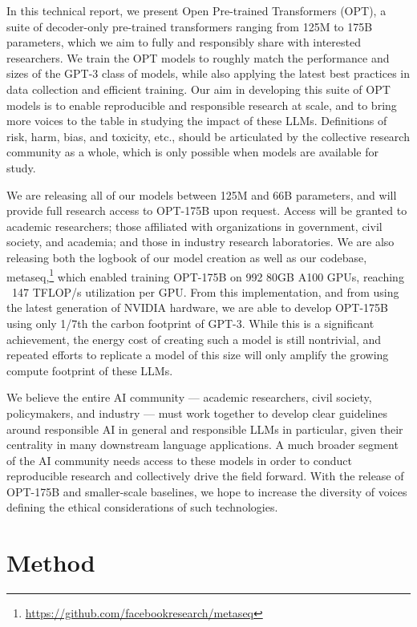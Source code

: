 \documentclass[11pt]{article}
\newcommand{\OPT}[0]{{OPT-175B}}
\newcommand{\biggpt}[1]{{GPT-3#1}}
\begin{document}
In this technical report, we present Open Pre-trained Transformers (OPT), a suite of decoder-only pre-trained transformers ranging from 125M to 175B parameters, which we aim to fully and responsibly share with interested researchers. We train the OPT models to roughly match the performance and sizes of the GPT-3 class of models, while also applying the latest best practices in data collection and efficient training. Our aim in developing this suite of OPT models is to enable reproducible and responsible research at scale, and to bring more voices to the table in studying the impact of these LLMs.  Definitions of risk, harm, bias, and toxicity, etc., should be articulated by the collective research community as a whole, which is only possible when models are available for study.  

We are releasing all of our models between 125M and 66B parameters, and will provide full research access to OPT-175B upon request. Access will be granted to academic researchers; those affiliated with organizations in government, civil society, and academia; and those in industry research laboratories. 
We are also releasing both the logbook of our model creation as well as our codebase, {metaseq},\footnote{\url{https://github.com/facebookresearch/metaseq}} which enabled training \OPT{} on 992 80GB A100 GPUs, reaching ~147 TFLOP/s utilization per GPU.  From this implementation, and from using the latest generation of NVIDIA hardware, we are able to develop \OPT{} using only 1/7th the carbon footprint of \biggpt{.}  While this is a significant achievement, the energy cost of creating such a model is still nontrivial, and repeated efforts to replicate a model of this size will only amplify the growing compute footprint of these LLMs.

We believe the entire AI community — academic researchers, civil society, policymakers, and industry — must work together to develop clear guidelines around responsible AI in general and responsible LLMs in particular, given their centrality in many downstream language applications. A much broader segment of the AI community needs access to these models in order to conduct reproducible research and collectively drive the field forward. With the release of OPT-175B and smaller-scale baselines, we hope to increase the diversity of voices defining the ethical considerations of such technologies.

\section{Method}
\label{sec:method}
\end{document}
